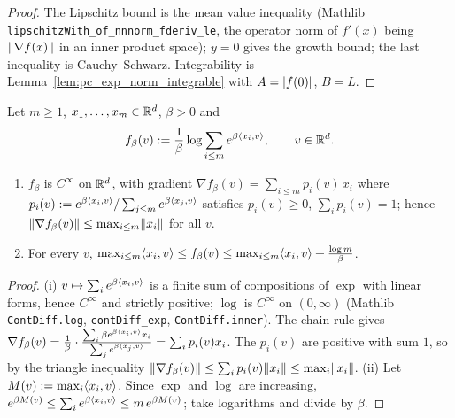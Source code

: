 \begin{proof}
\leanok
{}
The Lipschitz bound is the mean value inequality (Mathlib
\texttt{lipschitzWith\_of\_nnnorm\_fderiv\_le}, the operator norm of $f'(x)$ being
$\lVert \nabla f(x) \rVert$ in an inner product space); $y = 0$ gives the growth bound; the last
inequality is Cauchy--Schwarz. Integrability is Lemma~\ref{lem:pc_exp_norm_integrable} with
$A = \lvert f(0) \rvert$, $B = L$.
\end{proof}

\begin{lemma}\label{lem:logsumexp_props}
\leanok
Let $m \ge 1$, $x_1,\dots,x_m \in \mathbb{R}^d$, $\beta > 0$ and
\[
  f_\beta(v) := \frac1\beta\log\sum_{i\le m}e^{\beta\langle x_i, v \rangle}, \qquad v \in \mathbb{R}^d .
\]
\begin{enumerate}
  \item[(i)] $f_\beta$ is $C^\infty$ on $\mathbb{R}^d$, with gradient
        $\nabla f_\beta(v) = \sum_{i\le m}p_i(v)\,x_i$ where
        $p_i(v) := e^{\beta\langle x_i, v \rangle}/\sum_{j\le m}e^{\beta\langle x_j, v \rangle}$ satisfies $p_i(v) \ge 0$,
        $\sum_ip_i(v) = 1$; hence $\lVert \nabla f_\beta(v) \rVert \le \max_{i\le m}\lVert x_i \rVert$ for all $v$.
  \item[(ii)] For every $v$,
        $\max_{i\le m}\langle x_i, v \rangle \le f_\beta(v) \le \max_{i\le m}\langle x_i, v \rangle + \frac{\log m}{\beta}$.
\end{enumerate}
\end{lemma}

\begin{proof}
\leanok
(i) $v \mapsto \sum_ie^{\beta\langle x_i, v \rangle}$ is a finite sum of compositions of $\exp$ with
linear forms, hence $C^\infty$ and strictly positive; $\log$ is $C^\infty$ on $(0,\infty)$
(Mathlib \texttt{ContDiff.log}, \texttt{contDiff\_exp}, \texttt{ContDiff.inner}). The chain
rule gives $\nabla f_\beta(v) = \frac1\beta\cdot\frac{\sum_i\beta e^{\beta\langle x_i, v \rangle}x_i}
{\sum_je^{\beta\langle x_j, v \rangle}} = \sum_ip_i(v)x_i$. The $p_i(v)$ are positive with sum $1$, so by
the triangle inequality $\lVert \nabla f_\beta(v) \rVert \le \sum_ip_i(v)\lVert x_i \rVert \le \max_i\lVert x_i \rVert$.
(ii) Let $M(v) := \max_i\langle x_i, v \rangle$. Since $\exp$ and $\log$ are increasing,
$e^{\beta M(v)} \le \sum_ie^{\beta\langle x_i, v \rangle} \le m\,e^{\beta M(v)}$; take logarithms and
divide by $\beta$.
\end{proof}

